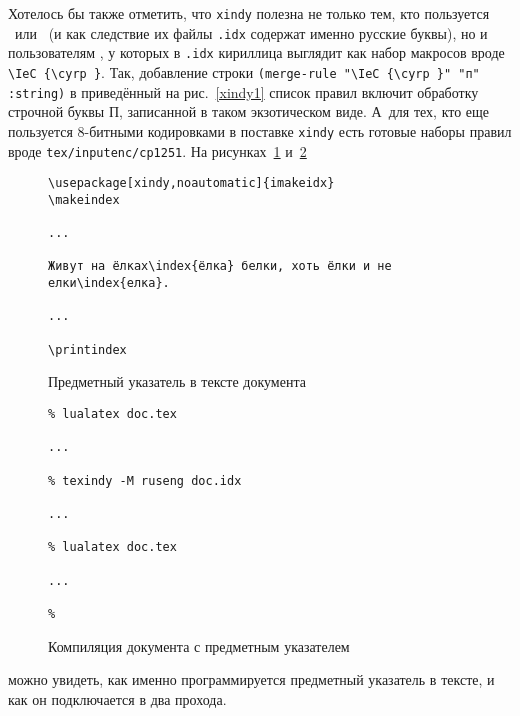 \documentclass[a4paper,12pt]{article}
\newcommand\exe[1]{\texttt{#1}}
\newcommand\file[1]{\texttt{#1}}
\begin{document}
Хотелось бы также отметить, что \exe{xindy} полезна не только тем, кто пользуется
\LuaLaTeX\ или \XeTeX\ (и как следствие их файлы \file{.idx} содержат именно русские буквы),
но и пользователям \pdfLaTeX, у которых в \file{.idx} кириллица выглядит как набор макросов
вроде \verb|\IeC {\cyrp }|. Так, добавление строки
\verb|(merge-rule "\IeC {\cyrp }" "п" :string)| в приведённый на рис.~\ref{xindy1} список правил
включит обработку строчной буквы П, записанной в таком экзотическом виде. А~для тех, кто
еще пользуется 8-битными кодировками в поставке \exe{xindy} есть готовые наборы правил
вроде \file{tex/inputenc/cp1251}.
На рисунках~\ref{xindy2} и~\ref{xindy3}
\begin{figure}[tp]
\begin{tcolorbox}
\footnotesize
\begin{verbatim}
\usepackage[xindy,noautomatic]{imakeidx}
\makeindex

...

Живут на ёлках\index{ёлка} белки, хоть ёлки и не елки\index{елка}.

...

\printindex
\end{verbatim}
\end{tcolorbox}
\caption{Предметный указатель в тексте документа}\label{xindy2}
\end{figure}
\begin{figure}[tp]
\begin{tcolorbox}
\footnotesize
\begin{verbatim}
% lualatex doc.tex

...

% texindy -M ruseng doc.idx

...

% lualatex doc.tex

...

%
\end{verbatim}
\end{tcolorbox}
\caption{Компиляция документа с предметным указателем}\label{xindy3}
\end{figure}
можно увидеть, как именно программируется
предметный указатель в тексте, и как он подключается в два прохода.
\end{document}
